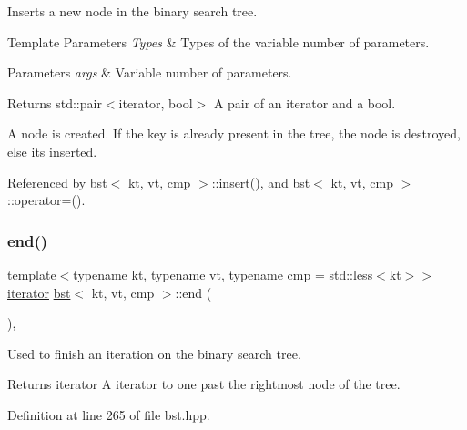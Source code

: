 Inserts a new node in the binary search tree. 


\begin{DoxyTemplParams}{Template Parameters}
{\em Types} & Types of the variable number of parameters. \\
\hline
\end{DoxyTemplParams}

\begin{DoxyParams}{Parameters}
{\em args} & Variable number of parameters. \\
\hline
\end{DoxyParams}
\begin{DoxyReturn}{Returns}
std\+::pair$<$iterator, bool$>$ A pair of an iterator and a bool.
\end{DoxyReturn}
A node is created. If the key is already present in the tree, the node is destroyed, else it\textquotesingle{}s inserted. 

Referenced by bst$<$ kt, vt, cmp $>$\+::insert(), and bst$<$ kt, vt, cmp $>$\+::operator=().

\mbox{\label{classbst_aed3a831efc810b5084cb0c9f4adeb16a}} 
\subsubsection{\texorpdfstring{end()}{end()}\hspace{0.1cm}{\footnotesize\ttfamily [1/2]}}
{\footnotesize\ttfamily template$<$typename kt, typename vt, typename cmp = std\+::less$<$kt$>$$>$ \\
\hyperlink{classbst_a429b0445783ff6486882db5dee900ce0}{iterator} \hyperlink{classbst}{bst}$<$ kt, vt, cmp $>$\+::end (\begin{DoxyParamCaption}{ }\end{DoxyParamCaption})\hspace{0.3cm}{\ttfamily [inline]}, {\ttfamily [noexcept]}}



Used to finish an iteration on the binary search tree. 

\begin{DoxyReturn}{Returns}
iterator A iterator to one past the rightmost node of the tree. 
\end{DoxyReturn}


Definition at line 265 of file bst.\+hpp.

\mbox{\label{classbst_aa9fa40cf0781035f180aa56d15f0e2d1}} 
